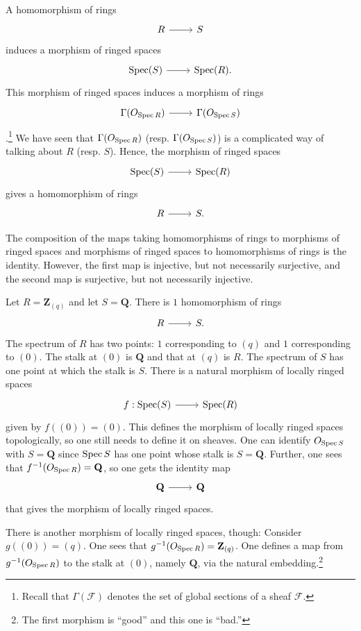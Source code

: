 \documentclass [11 pt, oneside] {article}
\begin{document}
A homomorphism of rings
\[
\begin{tikzcd}
R\ar[r]&S
\end{tikzcd}
\] 
induces a morphism of ringed spaces
\[
\begin{tikzcd}
\Spec(S)\ar[r]& \Spec(R).
\end{tikzcd}
\] 
This morphism of ringed spaces induces a morphism of rings 
\[
\begin{tikzcd}
\Gamma(\mathscr{O}_{\Spec R})\ar[r]& \Gamma(\mathscr{O}_{\Spec S})
\end{tikzcd}
\] 
.\footnote{Recall that $\Gamma(\mathscr{F})$ denotes the set of global sections of a sheaf $\mathscr{F}$.} We have seen that $\Gamma(\relax{O}_{\operatorname{Spec} R})$ (resp. $\Gamma(\relax{O}_{\operatorname{Spec} S})$) is a complicated way of talking about $R$ (resp. $S$). Hence, the morphism of ringed spaces 
\[
\begin{tikzcd}
\Spec(S)\ar[r]&\Spec(R)
\end{tikzcd}
\] 
gives a homomorphism of rings 
\[
\begin{tikzcd}
R\ar[r]&S.
\end{tikzcd}
\] 

The composition of the maps taking homomorphisms of rings to morphisms of ringed spaces and morphisms of ringed spaces to homomorphisms of rings is the identity. However, the first map is injective, but not necessarily surjective, and the second map is surjective, but not necessarily injective.

\begin{example}[ ]\label{}\text{}
Let $R= \mathbf{Z}_{(q)}$ and let $S=\mathbf{Q}$. There is $1$ homomorphism of rings
\[
\begin{tikzcd}
R\ar[r]&S.
\end{tikzcd}
\] 
The spectrum of $R$ has two points: $1$ corresponding to $(q)$ and $1$ corresponding to $ (0)$. The stalk at $(0)$ is $\mathbf{Q}$ and that at $(q)$ is $R$. The spectrum of $S$ has one point at which the stalk is $S$. There is a natural morphism of locally ringed spaces 
\[
\begin{tikzcd}
f:\Spec(S)\ar[r]&\Spec(R)
\end{tikzcd}
\] 
given by $f((0))=  (0)$. 
This defines the morphism of locally ringed spaces topologically, so one still needs to define it on sheaves. One can identify $\relax{O}_{\operatorname{Spec} S}$ with $S=\mathbf{Q}$ since $\operatorname{Spec} S$ has one point whose stalk is $S=\mathbf{Q}$. Further, one sees that $f^{-1}(\relax{O}_{\operatorname{Spec} R})= \mathbf{Q}$, so one gets the identity map 
\[
\begin{tikzcd}
\Q\ar[r]&\Q
\end{tikzcd}
\] 
that gives the morphism of locally ringed spaces.

There is another morphism of locally ringed spaces, though: Consider $g((0)) = (q)$. One sees that $g^{-1}(\relax{O}_{\operatorname{Spec} R})= \mathbf{Z}_{(q)}$. One defines a map from $g^{-1}(\relax{O}_{\operatorname{Spec} R})$ to the stalk at $(0)$, namely $\mathbf{Q}$, via the natural embedding.\footnote{The first morphism is ``good'' and this one is ``bad.''} 
\end{example}
\end{document}

